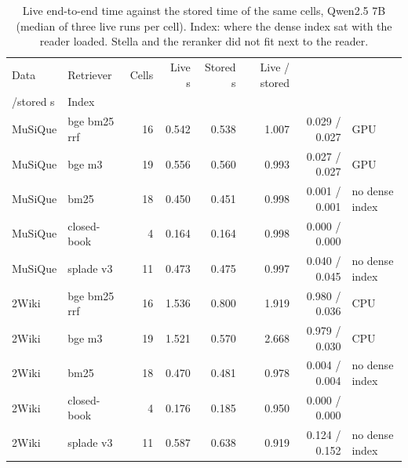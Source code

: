 \begin{table}[t]
\centering\small
\setlength{\tabcolsep}{4pt}
\caption{Live end-to-end time against the stored time of the same cells, Qwen2.5 7B (median of three live runs per cell). Index: where the dense index sat with the reader loaded. Stella and the reranker did not fit next to the reader.}
\label{tab:review_latency}
\begin{tabular*}{\linewidth}{@{\extracolsep{\fill}}llrrrrrl}
\toprule
Data & Retriever & Cells & Live s & Stored s & Live / stored & \begin{tabular}[b]{@{}r@{}}Retrieval live \\ /stored s\end{tabular} & Index \\
\midrule
MuSiQue & bge bm25 rrf & 16 & 0.542 & 0.538 & 1.007 & 0.029 / 0.027 & GPU \\
MuSiQue & bge m3 & 19 & 0.556 & 0.560 & 0.993 & 0.027 / 0.027 & GPU \\
MuSiQue & bm25 & 18 & 0.450 & 0.451 & 0.998 & 0.001 / 0.001 & no dense index \\
MuSiQue & closed-book & 4 & 0.164 & 0.164 & 0.998 & 0.000 / 0.000 &  \\
MuSiQue & splade v3 & 11 & 0.473 & 0.475 & 0.997 & 0.040 / 0.045 & no dense index \\
2Wiki & bge bm25 rrf & 16 & 1.536 & 0.800 & 1.919 & 0.980 / 0.036 & CPU \\
2Wiki & bge m3 & 19 & 1.521 & 0.570 & 2.668 & 0.979 / 0.030 & CPU \\
2Wiki & bm25 & 18 & 0.470 & 0.481 & 0.978 & 0.004 / 0.004 & no dense index \\
2Wiki & closed-book & 4 & 0.176 & 0.185 & 0.950 & 0.000 / 0.000 &  \\
2Wiki & splade v3 & 11 & 0.587 & 0.638 & 0.919 & 0.124 / 0.152 & no dense index \\
\bottomrule
\end{tabular*}
\end{table}
